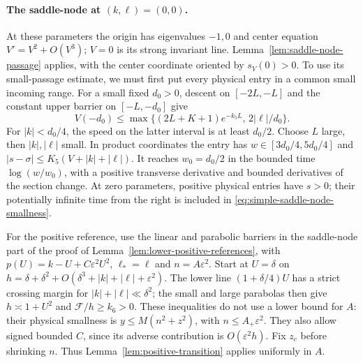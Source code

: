 \paragraph{The saddle-node at $(k,\ell)=(0,0)$.}
At these parameters the origin has eigenvalues $-1,0$ and center
equation $V'=V^2+O(V^3)$; $V=0$ is its strong invariant line.
Lemma~\ref{lem:saddle-node-passage} applies, with the center coordinate
oriented by $s_V(0)>0$. To use its small-passage estimate, we must first
put every physical entry in a common small incoming range.
For a small fixed $d_0>0$, descent on $[-2L,-L]$ and the constant
upper barrier on $[-L,-d_0]$ give
\begin{equation}\label{eq:simple-central-entry}
 V(-d_0)\le
 \max\{(2L+K+1)e^{-k_5L},\,2|\ell|/d_0\}.
\end{equation}
For $|k|<d_0/4$, the speed on the latter interval is at least $d_0/2$.
Choose $L$ large, then $|k|,|\ell|$ small.  In product coordinates
the entry has $w\in[3d_0/4,5d_0/4]$ and
$|s-\sigma|\le K_5(V+|k|+|\ell|)$.
It reaches $w_0=d_0/2$ in the bounded time $\log(w/w_0)$, with a
positive transverse derivative and bounded derivatives of the section
change.  At zero parameters, positive physical entries have $s>0$;
their potentially infinite time from the right is included in
\eqref{eq:simple-saddle-node-smallness}.

For the positive reference, use the linear and parabolic barriers in
the saddle-node part of the proof of
Lemma~\ref{lem:lower-positive-references}, with
$p(U)=k-U+C\varepsilon^2U^2$, $\ell_*=\ell$ and
$n=A\varepsilon^2$. Start at $U=\delta$ on
$h=\delta+\delta^2+O(\delta^3+|k|+|\ell|+\varepsilon^2)$.
The lower line $(1+\delta/4)U$ has a strict crossing margin for
$|k|+|\ell|\ll\delta^2$; the small and large parabolas then give
$h\asymp1+U^2$ and $\mathcal F/h\ge k_6>0$.
These inequalities do not use a lower bound for $A$: their physical
smallness is $y\le M(n^2+z^2)$, with $n\le A_+\varepsilon^2$.
They also allow signed bounded $C$, since its adverse contribution is
$O(\varepsilon^2h)$. Fix $z_c$ before shrinking $n$.
Thus Lemma~\ref{lem:positive-transition} applies uniformly in $A$.


